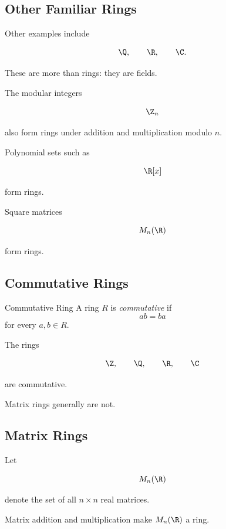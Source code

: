 \subsection{Other Familiar Rings}
\label{subsec:familiar-rings}

Other examples include

\[ \Q,\qquad \R,\qquad \C. \]

These are more than rings: they are fields.

The modular integers

\[ \Z_n \]

also form rings under addition and multiplication modulo \(n\).

Polynomial sets such as

\[ \R[x] \]

form rings.

Square matrices

\[ M_n(\R) \]

form rings.

\subsection{Commutative Rings}
\label{subsec:commutative-rings}

\begin{definitionbox}{Commutative Ring}
A ring \(R\) is \emph{commutative} if
\[ ab=ba \]
for every \(a,b\in R\).
\end{definitionbox}

The rings

\[ \Z,\qquad\Q,\qquad\R,\qquad\C \]

are commutative.

Matrix rings generally are not.

\subsection{Matrix Rings}
\label{subsec:matrix-rings}

Let

\[ M_n(\R) \]

denote the set of all \(n\times n\) real matrices.

Matrix addition and multiplication make \(M_n(\R)\) a ring.

